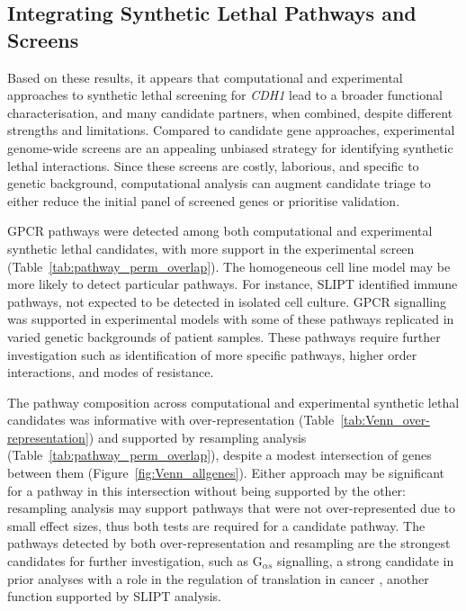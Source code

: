 \subsection{Integrating Synthetic Lethal Pathways and Screens}

Based on these results, it appears that computational and experimental approaches to synthetic lethal screening for \textit{CDH1} lead to a broader functional characterisation, and many candidate partners, when combined, despite different strengths and limitations. Compared to candidate gene approaches, experimental genome-wide screens are an appealing unbiased strategy for identifying synthetic lethal interactions. Since these screens are costly, laborious, and specific to genetic background, computational analysis can augment candidate triage to either reduce the initial panel of screened genes or prioritise validation.

GPCR pathways were detected among both computational and experimental synthetic lethal candidates, with more support in the experimental screen (Table~\ref{tab:pathway_perm_overlap}). The homogeneous cell line model may be more likely to detect particular pathways. For instance, \gls{SLIPT} identified immune pathways, not expected to be detected in isolated cell culture. GPCR signalling was supported in experimental models \cite{Telford2015} with some of these pathways replicated in varied genetic backgrounds of patient samples. These pathways require further investigation such as identification of more specific pathways, higher order interactions, and modes of resistance.

The pathway composition across computational and experimental synthetic lethal candidates was informative with over-represent\-ation (Table~\ref{tab:Venn_over-representation}) and supported by resampling analysis (Table~\ref{tab:pathway_perm_overlap}), despite a modest intersection of genes between them (Figure~\ref{fig:Venn_allgenes}).
Either approach may be significant for a pathway in this intersection without being supported by the other: resampling analysis may support pathways that were not over-represent\-ed due to small effect sizes, thus both tests are required for a candidate pathway.
The pathways detected by both over-represent\-ation and resampling are the strongest candidates for further investigation, such as G$_{\alpha s}$ signalling, a strong candidate in prior analyses with a role in the regulation of translation in cancer \cite{Gao2015}, another function supported by \gls{SLIPT} analysis.

